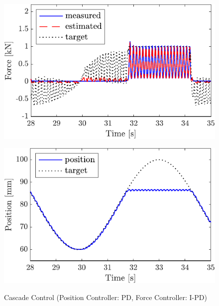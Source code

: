 \begin{figure}[t]
    \begin{minipage}{\minipageratio\hsize}
    \centering
        \includegraphics[keepaspectratio, scale = \minifigscale]{contents/IntegrationControl/figure/SECASQ/crop-FBcsqtch_IPD_Notrq_posPIDadjust_force.pdf}
        \label{fig5:crop-FBcsqtch_IPD_Notrq_posPIDadjust_force}
    \end{minipage}
    \begin{minipage}{\minipageratio\hsize}
    \centering
        \includegraphics[keepaspectratio, scale = \minifigscale]{contents/IntegrationControl/figure/SECASQ/crop-FBcsqtch_IPD_Notrq_posPIDadjust_pos.pdf}
        \label{fig5:crop-FBcsqtch_IPD_Notrq_posPIDadjust_pos}
    \end{minipage}
    \caption{Cascade Control (Position Controller: PD, Force Controller: I-PD)}  
    \label{fig5:crop-FBcsqtch_IPD_Notrq_posPIDadjust}
\end{figure}

